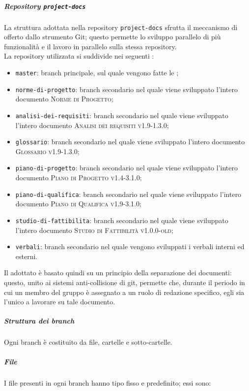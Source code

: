 \documentclass[../norme-di-progetto.tex]{subfiles}
\begin{document}
\subparagraph{Repository \texttt{project-docs}}
La struttura adottata nella repository \texttt{project-docs} sfrutta il meccanismo di  offerto dallo strumento Git; questo permette lo sviluppo parallelo di più funzionalità e il lavoro in parallelo sulla stessa repository. \\
La repository utilizzata si suddivide nei seguenti :
\begin{itemize}
  \item \texttt{master}: branch principale, sul quale vengono fatte le ;
  \item \texttt{norme-di-progetto}: branch secondario nel quale viene sviluppato l'intero documento \textsc{Norme di Progetto};
  \item \texttt{analisi-dei-requisiti}: branch secondario nel quale viene sviluppato l'intero documento \textsc{Analisi dei requisiti v1.9-1.3.0};
  \item \texttt{glossario}: branch secondario nel quale viene sviluppato l'intero documento \textsc{Glossario v1.9-1.3.0};
  \item \texttt{piano-di-progetto}: branch secondario nel quale viene sviluppato l'intero documento \textsc{Piano di Progetto v1.4-3.1.0};
  \item \texttt{piano-di-qualifica}: branch secondario nel quale viene sviluppato l'intero documento \textsc{Piano di Qualifica v1.9-3.1.0};
  \item \texttt{studio-di-fattibilita}: branch secondario nel quale viene sviluppato l'intero documento \textsc{Studio di Fattibilità v1.0.0-old};
  \item \texttt{verbali}: branch secondario nel quale vengono sviluppati i verbali interni ed esterni.
\end{itemize}
Il  adottato è basato quindi su un principio della separazione dei documenti: questo, unito ai sistemi anti-collisione di git, permette che, durante il periodo in cui un membro del gruppo è assegnato a un ruolo di redazione specifico, egli sia l'unico a lavorare su tale documento.
\subparagraph*{Struttura dei branch}
Ogni branch è costituito da file, cartelle e sotto-cartelle.
\subparagraph*{File}
I file presenti in ogni branch hanno tipo fisso e predefinito; essi sono:
\end{document}
